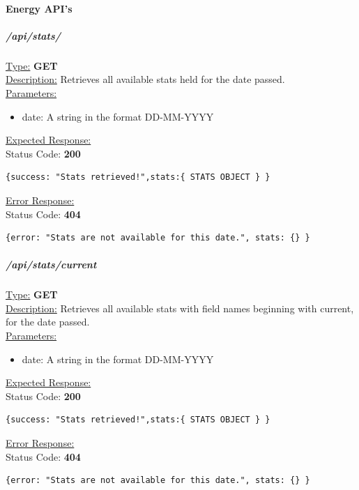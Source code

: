 \documentclass[preprint,12pt,3p]{elsarticle}
\newcommand{\forceindent}{\leavevmode{\parindent=1em\indent}}
\begin{document}
\paragraph{Energy API's}
\subparagraph*{/api/stats/}
\underline{Type:} \textbf{GET}\\

\underline{Description:} Retrieves all available stats held for the date passed.\\

\underline{Parameters:}

\begin{itemize}
\item date: A string in the format DD-MM-YYYY
\end{itemize}

\underline{Expected Response:}\\[5pt]
\forceindent Status Code: \textbf{200} \\
\begin{verbatim}
{success: "Stats retrieved!",stats:{ STATS OBJECT } }
\end{verbatim}
\underline{Error Response:}\\[5pt]
\forceindent Status Code: \textbf{404} \\
\begin{verbatim}
{error: "Stats are not available for this date.", stats: {} }
\end{verbatim}

\subparagraph*{/api/stats/current}
\underline{Type:} \textbf{GET}\\

\underline{Description:} Retrieves all available stats with field names beginning with current, for the date passed.\\

\underline{Parameters:}

\begin{itemize}
\item date: A string in the format DD-MM-YYYY
\end{itemize}

\underline{Expected Response:}\\[5pt]
\forceindent Status Code: \textbf{200} \\
\begin{verbatim}
{success: "Stats retrieved!",stats:{ STATS OBJECT } }
\end{verbatim}
\underline{Error Response:}\\[5pt]
\forceindent Status Code: \textbf{404} \\
\begin{verbatim}
{error: "Stats are not available for this date.", stats: {} }
\end{verbatim}
\end{document}
